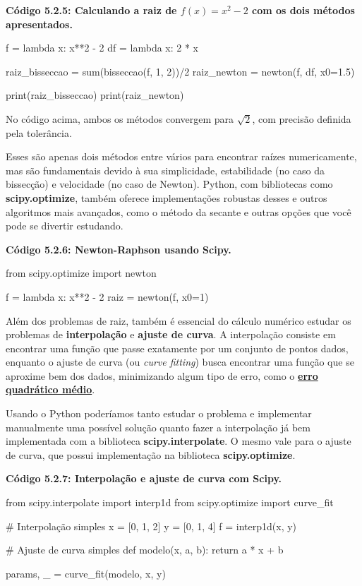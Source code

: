 \documentclass[11pt, a4paper]{article}
\begin{document}
\textbf{Código 5.2.5: Calculando a raiz de \(f(x)=x^2-2\) com os dois métodos apresentados.}

\begin{code}
f = lambda x: x**2 - 2
df = lambda x: 2 * x

raiz_bisseccao = sum(bisseccao(f, 1, 2))/2
raiz_newton = newton(f, df, x0=1.5)

print(raiz_bisseccao)
print(raiz_newton)
\end{code}

No código acima, ambos os métodos convergem para \(\sqrt{2}\), com precisão definida pela tolerância.

Esses são apenas dois métodos entre vários para encontrar raízes numericamente, mas são fundamentais devido à sua simplicidade, estabilidade (no caso da bissecção) e velocidade (no caso de Newton). Python, com bibliotecas como \textbf{scipy.optimize}, também oferece implementações robustas desses e outros algoritmos mais avançados, como o método da secante e outras opções que você pode se divertir estudando.

\textbf{Código 5.2.6: Newton-Raphson usando Scipy.}

\begin{code}
from scipy.optimize import newton

f = lambda x: x**2 - 2
raiz = newton(f, x0=1)
\end{code}

Além dos problemas de raiz, também é essencial do cálculo numérico estudar os problemas de \textbf{interpolação} e \textbf{ajuste de curva}. A interpolação consiste em encontrar uma função que passe exatamente por um conjunto de pontos dados, enquanto o ajuste de curva (ou \textit{curve fitting}) busca encontrar uma função que se aproxime bem dos dados, minimizando algum tipo de erro, como o \textbf{\href{https://en-m-wikipedia-org.translate.goog/wiki/Mean_squared_error?_x_tr_sl=en&_x_tr_tl=pt&_x_tr_hl=pt&_x_tr_pto=wa}{erro quadrático médio}}.

Usando o Python poderíamos tanto estudar o problema e implementar manualmente uma possível solução quanto fazer a interpolação já bem implementada com a biblioteca \textbf{scipy.interpolate}. O mesmo vale para o ajuste de curva, que possui implementação na biblioteca \textbf{scipy.optimize}.

\textbf{Código 5.2.7: Interpolação e ajuste de curva com Scipy.}

\begin{code}
from scipy.interpolate import interp1d
from scipy.optimize import curve_fit

# Interpolação simples
x = [0, 1, 2]
y = [0, 1, 4]
f = interp1d(x, y)

# Ajuste de curva simples
def modelo(x, a, b):
    return a * x + b

params, _ = curve_fit(modelo, x, y)
\end{code}
\end{document}
